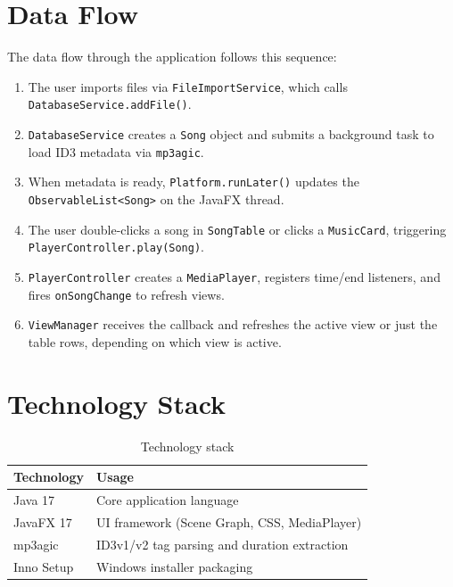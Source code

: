 ﻿\documentclass[12pt]{report}
\begin{document}
\section{Data Flow}
The data flow through the application follows this sequence:

\begin{enumerate}
    \item The user imports files via \texttt{FileImportService}, which calls \texttt{DatabaseService.addFile()}.
    \item \texttt{DatabaseService} creates a \texttt{Song} object and submits a background task to load ID3 metadata via \texttt{mp3agic}.
    \item When metadata is ready, \texttt{Platform.runLater()} updates the \texttt{ObservableList<Song>} on the JavaFX thread.
    \item The user double-clicks a song in \texttt{SongTable} or clicks a \texttt{MusicCard}, triggering \texttt{PlayerController.play(Song)}.
    \item \texttt{PlayerController} creates a \texttt{MediaPlayer}, registers time/end listeners, and fires \texttt{onSongChange} to refresh views.
    \item \texttt{ViewManager} receives the callback and refreshes the active view or just the table rows, depending on which view is active.
\end{enumerate}

\section{Technology Stack}
\begin{table}[htbp]
\centering
\caption{Technology stack}
\begin{tabular}{|p{4cm}|p{10cm}|}
\hline
\textbf{Technology} & \textbf{Usage} \\ \hline
Java 17 & Core application language \\ \hline
JavaFX 17 & UI framework (Scene Graph, CSS, MediaPlayer) \\ \hline
mp3agic & ID3v1/v2 tag parsing and duration extraction \\ \hline
Inno Setup & Windows installer packaging \\ \hline
\end{tabular}
\end{table}


\newpage
\end{document}
